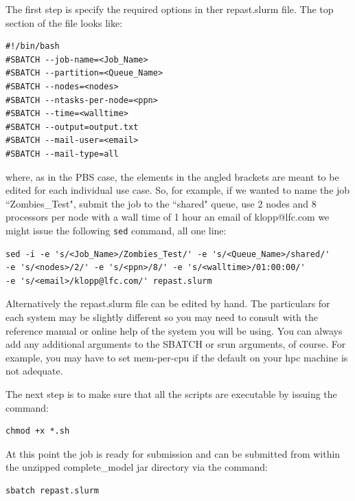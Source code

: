 \documentclass[11pt]{amsart}
\begin{document}
The first step is specify the required options in ther repast.slurm file. The top section of the file looks like:
\begin{verbatim}
#!/bin/bash
#SBATCH --job-name=<Job_Name>                                                                                   
#SBATCH --partition=<Queue_Name>                                                                                
#SBATCH --nodes=<nodes>                                                                                         
#SBATCH --ntasks-per-node=<ppn>                                                                                 
#SBATCH --time=<walltime>                                                                                       
#SBATCH --output=output.txt                                                                                     
#SBATCH --mail-user=<email>                                                                                     
#SBATCH --mail-type=all                                                                                         
\end{verbatim}

\noindent where, as in the PBS case, the elements in the angled brackets are meant to be edited for each individual use case. So, for example, if we wanted to name the job ``Zombies\_Test", submit the job to the ``shared" queue,  use 2 nodes and 8 processors per node with a wall time of 1 hour an email of klopp@lfc.com we might issue the following \texttt{sed} command, all one line:
\begin{verbatim}
sed -i -e 's/<Job_Name>/Zombies_Test/' -e 's/<Queue_Name>/shared/'
-e 's/<nodes>/2/' -e 's/<ppn>/8/' -e 's/<walltime>/01:00:00/' 
-e 's/<email>/klopp@lfc.com/' repast.slurm
\end{verbatim}
Alternatively the repast.slurm file can be edited by hand. The particulars for each system may be slightly different so you may need to consult with the reference manual or online help of the system you will be using.  You can always add any additional arguments to the SBATCH or srun arguments, of course. For example, you may have to set mem-per-cpu if the default on your hpc machine is not adequate.

The next step is to make sure that all the scripts are executable by issuing the command:
\begin{verbatim}
chmod +x *.sh
\end{verbatim}
At this point the job is ready for submission and can be submitted from within the unzipped complete\_model jar directory via the command:
\begin{verbatim}
sbatch repast.slurm
\end{verbatim}
\end{document}
